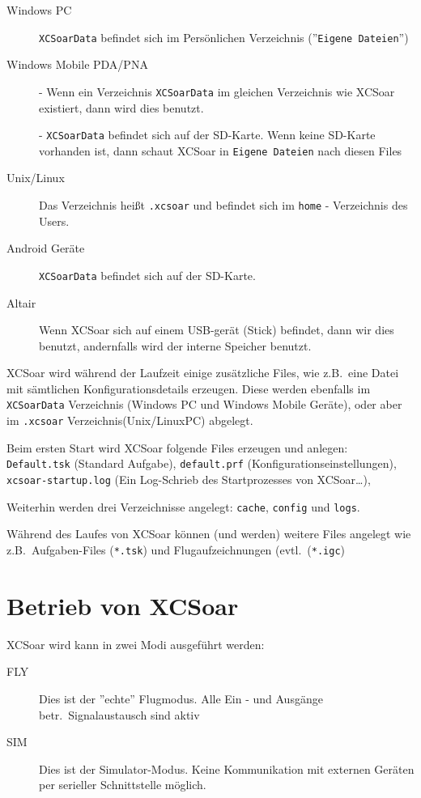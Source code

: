  
\begin{description}
\item[Windows PC]
\texttt{XCSoarData} befindet sich im Persönlichen Verzeichnis (''\texttt{Eigene Dateien}'')
\item[Windows Mobile PDA/PNA]
- Wenn ein Verzeichnis \texttt{XCSoarData} im gleichen Verzeichnis wie {\textsf  XCSoar} existiert, dann wird dies benutzt.  


- \texttt{XCSoarData} befindet sich auf der SD-Karte.  Wenn keine SD-Karte vorhanden ist, dann schaut {\textsf  XCSoar} in \texttt{Eigene Dateien} nach diesen Files

\item[Unix/Linux]
Das Verzeichnis heißt \verb|.xcsoar| und befindet sich im \verb|home| - Verzeichnis des Users. 
\item[Android Geräte]
\texttt{XCSoarData} befindet sich auf der SD-Karte.
\item[Altair]
Wenn {\textsf  XCSoar} sich auf einem USB-gerät (Stick) befindet, dann wir dies benutzt, andernfalls wird der interne Speicher benutzt. 
\end{description}


{\textsf  XCSoar} wird während der Laufzeit einige zusätzliche Files, wie z.B.\ eine Datei mit sämtlichen Konfigurationsdetails erzeugen.
Diese werden ebenfalls im \texttt{XCSoarData} Verzeichnis (Windows PC und Windows Mobile Geräte), oder aber im \texttt{.xcsoar} 
Verzeichnis(Unix/LinuxPC) abgelegt. 

Beim ersten Start wird {\textsf  XCSoar}  folgende Files erzeugen und anlegen: 
\texttt{Default.tsk} (Standard Aufgabe),  \texttt{default.prf} (Konfigurationseinstellungen), \texttt{xcsoar-startup.log} 
(Ein Log-Schrieb des Startprozesses von {\textsf  XCSoar}\dots), 



Weiterhin werden drei Verzeichnisse angelegt: \texttt{cache}, \texttt{config} und \texttt{logs}.  

Während des Laufes von {\textsf  XCSoar} können (und werden) weitere Files angelegt wie z.B.\  Aufgaben-Files (\texttt{*.tsk}) 
und Flugaufzeichnungen (evtl.\ (\texttt{*.igc})


\section{Betrieb von {\textsf  XCSoar}}

{\textsf  XCSoar} wird kann in zwei Modi ausgeführt werden:
\begin{description}
\item[FLY] Dies ist der ''echte'' Flugmodus. Alle Ein - und Ausgänge betr.\ Signalaustausch sind aktiv
\item[SIM] Dies ist der Simulator-Modus. Keine Kommunikation mit externen Geräten per serieller Schnittstelle möglich. 
\end{description}

